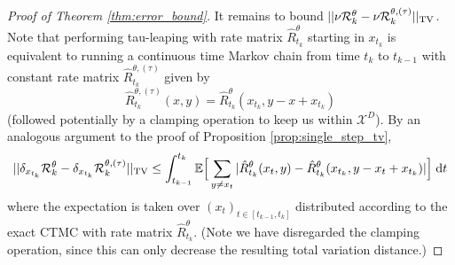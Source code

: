 \documentclass{article}
\begin{document}
\begin{proof}[Proof of Theorem \ref{thm:error_bound}]
It remains to bound $||\nu \mathcal{R}^{\theta}_k - \nu \mathcal{R}^{\theta, (\tau)}_k||_{\textup{TV}}$. Note that performing tau-leaping with rate matrix $\hat R_{t_k}^\theta$ starting in $x_{t_k}$ is equivalent to running a continuous time Markov chain from time $t_k$ to $t_{k-1}$ with constant rate matrix $\hat R^{\theta, (\tau)}_{t_k}$ given by
\begin{equation}
    \hat R^{\theta, (\tau)}_{t_k}(x,y) = \hat R^\theta_{t_k}(x_{t_k}, y - x + x_{t_k})
\end{equation}
(followed potentially by a clamping operation to keep us within $\mathcal{X}^D$). By an analogous argument to the proof of Proposition \ref{prop:single_step_tv},
\begin{equation}
    ||\delta_{x_{t_k}} \mathcal{R}^{\theta}_k - \delta_{x_{t_k}} \mathcal{R}^{\theta, (\tau)}_k||_{\textup{TV}} \leq \int_{t_{k-1}}^{t_k} \mathbb{E} \Big[ \sum_{y \neq x_t} |\hat R_{t_k}^\theta(x_t, y) - \hat R^\theta_{t_k}(x_{t_k}, y - x_t + x_{t_k})| \Big] \; \mathrm{d} t 
\end{equation}
where the expectation is taken over $(x_t)_{t \in [t_{k-1},t_k]}$ distributed according to the exact CTMC with rate matrix $\hat R_{t_k}^\theta$. (Note we have disregarded the clamping operation, since this can only decrease the resulting total variation distance.)


\end{proof}
\end{document}
